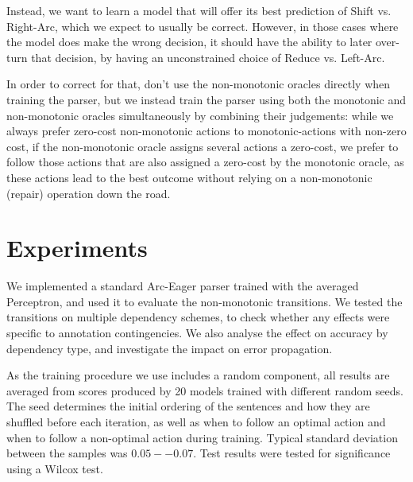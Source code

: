 \documentclass[11pt,letterpaper]{article}
\begin{document}
Instead,  we want to learn a model that will offer its best prediction of Shift vs.
Right-Arc, which we expect to usually be correct.  However, in those cases
where the model does make the wrong decision, it should have the ability to later over-turn that decision, by having an unconstrained
choice of Reduce vs. Left-Arc.

In order to correct for that, don't use the non-monotonic oracles directly
when training the parser, but we instead train the parser using both the
monotonic and non-monotonic oracles simultaneously by combining their
judgements: while we always prefer zero-cost non-monotonic actions to
monotonic-actions with non-zero cost, if the non-monotonic oracle assigns several actions a zero-cost,
we prefer to follow those actions that are also assigned a zero-cost by the
monotonic oracle, as these actions lead to the best outcome without
relying on a non-monotonic (repair) operation down the road.

\section{Experiments}

We implemented a standard Arc-Eager parser trained with the averaged Perceptron,
and used it to evaluate the non-monotonic transitions. We tested the transitions on
multiple dependency schemes, to check whether any effects were specific to annotation
contingencies. We also analyse the effect on accuracy by dependency type, and
investigate the impact on error propagation.

As the training procedure we use includes a random component, all results are averaged from scores produced by 20 models trained with
different random seeds. The seed determines the initial ordering of the
sentences and how they are shuffled before each iteration, as well as when to
follow an optimal action and when to follow a non-optimal action during training. Typical standard
deviation between the samples was $0.05--0.07$.
Test results were tested for significance using a Wilcox test.
\end{document}
